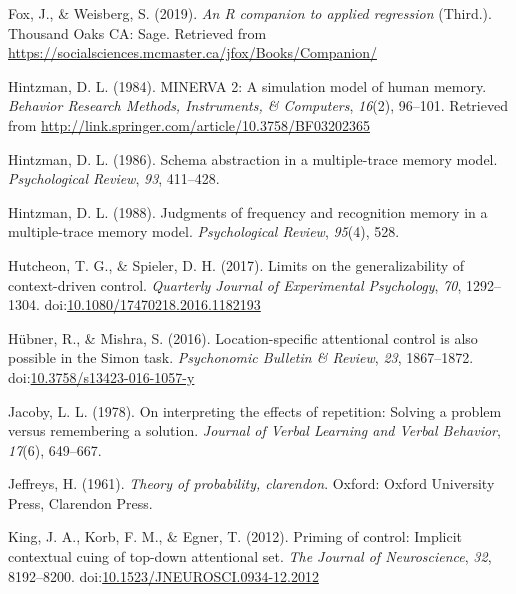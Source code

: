 \documentclass[english,,man,floatsintext]{apa6}
\begin{document}
\leavevmode\hypertarget{ref-r_car_2019}{}%
Fox, J., \& Weisberg, S. (2019). \emph{An R companion to applied regression} (Third.). Thousand Oaks CA: Sage. Retrieved from \url{https://socialsciences.mcmaster.ca/jfox/Books/Companion/}

\leavevmode\hypertarget{ref-hintzman_minerva_1984}{}%
Hintzman, D. L. (1984). MINERVA 2: A simulation model of human memory. \emph{Behavior Research Methods, Instruments, \& Computers}, \emph{16}(2), 96--101. Retrieved from \url{http://link.springer.com/article/10.3758/BF03202365}

\leavevmode\hypertarget{ref-hintzman_schema_1986}{}%
Hintzman, D. L. (1986). Schema abstraction in a multiple-trace memory model. \emph{Psychological Review}, \emph{93}, 411--428.

\leavevmode\hypertarget{ref-hintzman_judgments_1988}{}%
Hintzman, D. L. (1988). Judgments of frequency and recognition memory in a multiple-trace memory model. \emph{Psychological Review}, \emph{95}(4), 528.

\leavevmode\hypertarget{ref-hutcheon_limits_2017}{}%
Hutcheon, T. G., \& Spieler, D. H. (2017). Limits on the generalizability of context-driven control. \emph{Quarterly Journal of Experimental Psychology}, \emph{70}, 1292--1304. doi:\href{https://doi.org/10.1080/17470218.2016.1182193}{10.1080/17470218.2016.1182193}

\leavevmode\hypertarget{ref-hubner_location-specific_2016}{}%
Hübner, R., \& Mishra, S. (2016). Location-specific attentional control is also possible in the Simon task. \emph{Psychonomic Bulletin \& Review}, \emph{23}, 1867--1872. doi:\href{https://doi.org/10.3758/s13423-016-1057-y}{10.3758/s13423-016-1057-y}

\leavevmode\hypertarget{ref-jacoby_interpreting_1978}{}%
Jacoby, L. L. (1978). On interpreting the effects of repetition: Solving a problem versus remembering a solution. \emph{Journal of Verbal Learning and Verbal Behavior}, \emph{17}(6), 649--667.

\leavevmode\hypertarget{ref-jeffreys1961theory}{}%
Jeffreys, H. (1961). \emph{Theory of probability, clarendon}. Oxford: Oxford University Press, Clarendon Press.

\leavevmode\hypertarget{ref-king_priming_2012}{}%
King, J. A., Korb, F. M., \& Egner, T. (2012). Priming of control: Implicit contextual cuing of top-down attentional set. \emph{The Journal of Neuroscience}, \emph{32}, 8192--8200. doi:\href{https://doi.org/10.1523/JNEUROSCI.0934-12.2012}{10.1523/JNEUROSCI.0934-12.2012}
\end{document}
